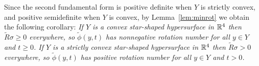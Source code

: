 \begin{remark}
Since the second fundamental form is positive definite when $Y$ is strictly convex, and positive semidefinite when $Y$ is convex, by Lemma~\ref{lem:minrot} we obtain the following corollary:
{\em If $Y$ is a convex star-shaped hypersurface in ${\mathbb R}^4$ then $\widetilde{R}\sigma\ge 0$ everywhere, so $\widetilde{\phi}(y,t)$ has nonnegative rotation number for all $y\in Y$ and $t\ge 0$.
If $Y$ is a strictly convex star-shaped hypersurface in ${\mathbb R}^4$ then $\widetilde{R}\sigma >0$ everywhere, so $\widetilde{\phi}(y,t)$ has positive rotation number for all $y\in Y$ and $t>0$.\/}
\end{remark}








